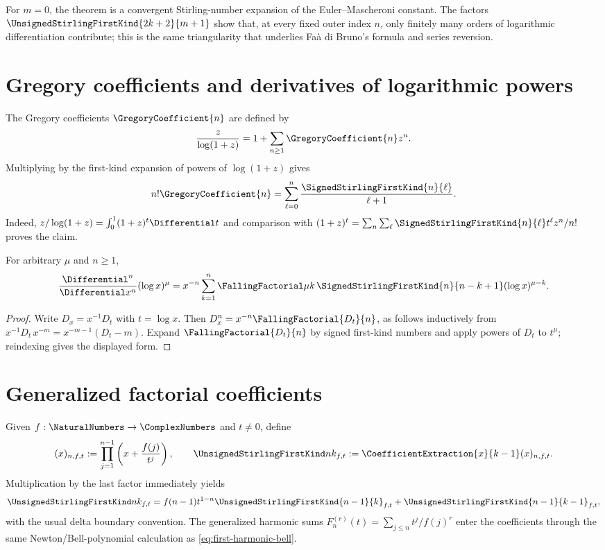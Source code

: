 \documentclass[11pt,a4paper,oneside,openany]{book}
\theoremstyle{definition}
\theoremstyle{remark}
\begin{document}
For $m=0$, the theorem is a convergent Stirling-number expansion of the
Euler--Mascheroni constant.  The factors
$\UnsignedStirlingFirstKind{2k+2}{m+1}$ show that, at every fixed outer index $n$, only finitely many
orders of logarithmic differentiation contribute; this is the same triangularity
that underlies Fa\`a di Bruno's formula and series reversion.
\section{Gregory coefficients and derivatives of logarithmic powers}
The Gregory coefficients $\GregoryCoefficient{n}$ are defined by
\[
 \frac{z}{\log(1+z)}=1+\sum_{n\ge1}\GregoryCoefficient{n}z^n.
\]
Multiplying by the first-kind expansion of powers of $\log(1+z)$ gives
\begin{equation}\label{eq:gregory-stirling}
 n!\GregoryCoefficient{n}=\sum_{\ell=0}^n\frac{\SignedStirlingFirstKind{n}{\ell}}{\ell+1}.
\end{equation}
Indeed,
$z/\log(1+z)=\int_0^1(1+z)^t\Differential t$ and comparison with
$(1+z)^t=\sum_n\sum_\ell \SignedStirlingFirstKind{n}{\ell}t^\ell z^n/n!$ proves the claim.

For arbitrary $\mu$ and $n\ge1$,
\begin{equation}\label{eq:log-power-derivative}
 \frac{\Differential^n}{\Differential x^n}(\log x)^\mu
 =x^{-n}\sum_{k=1}^n\FallingFactorial\mu k\,\SignedStirlingFirstKind{n}{n-k+1}(\log x)^{\mu-k}.
\end{equation}
\begin{proof}
Write $D_x=x^{-1}D_t$ with $t=\log x$.  Then
$D_x^n=x^{-n}\FallingFactorial{D_t}{n}$, as follows inductively from
$x^{-1}D_t\,x^{-m}=x^{-m-1}(D_t-m)$.  Expand
$\FallingFactorial{D_t}{n}$ by signed first-kind numbers and apply powers of $D_t$ to
$t^\mu$; reindexing gives the displayed form.
\end{proof}

\section{Generalized factorial coefficients}
Given $f:\NaturalNumbers\to\ComplexNumbers$ and $t\ne0$, define
\begin{equation}\label{eq:generalized-factorial-product}
 (x)_{n,f,t}:=\prod_{j=1}^{n-1}\left(x+\frac{f(j)}{t^j}\right),
 \qquad
 \UnsignedStirlingFirstKind nk_{f,t}:=\CoefficientExtraction{x}{k-1}(x)_{n,f,t}.
\end{equation}
Multiplication by the last factor immediately yields
\begin{equation}\label{eq:generalized-first-recurrence}
 \UnsignedStirlingFirstKind nk_{f,t}
 =f(n-1)t^{1-n}\UnsignedStirlingFirstKind{n-1}{k}_{f,t}
  +\UnsignedStirlingFirstKind{n-1}{k-1}_{f,t},
\end{equation}
with the usual delta boundary convention.  The generalized harmonic sums
$F_n^{(r)}(t)=\sum_{j\le n}t^j/f(j)^r$ enter the coefficients through the same
Newton/Bell-polynomial calculation as \cref{eq:first-harmonic-bell}.
\end{document}
